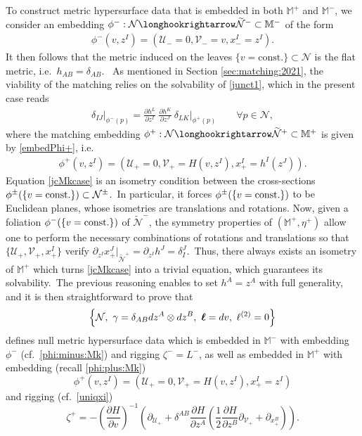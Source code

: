 \documentclass[11pt]{article}
\numberwithin{equation}{section}
\def\Mkp{\mathbb{M}^+}
\def\Mkm{\mathbb{M}^-}
\def\flatp{\eta^+}
\newcommand{\bm}[1]{\mbox{\boldmath $#1$}}
\newcommand\N{\mathcal N}
\newcommand\elltwo{\ell^{(2)}}
\newcommand\rig{\zeta}
\def\bmell{\bm{\ell}}
\def\ellc{\bmell}
\def\bmell{\bm{\ell}}
\def\ellc{\bmell}
\newcommand{\cp}{\partial}
\newcommand{\lp}{\left(}
\newcommand{\rp}{\right)}
\newcommand{\cu}{\mathcal{U}}
\newcommand{\cv}{\mathcal{V}}
\newcommand{\nullhyp}{\widetilde{\N}}
\newcommand{\spc}{\textup{ }}
\begin{document}
To construct metric hypersurface data that is embedded in both $\Mkp$ and $\Mkm$, 
we consider an embedding $\phi^-:\N\longhookrightarrow\nullhyp^-\subset\Mkm$ of the form
\begin{align}
	\label{phi:minus:Mk} 
	\phi^-(v, z^I) =\left(\cu_-=0,\cv_-= v, x_-^I=z^I \right ).
\end{align}
It then follows that the metric induced on the leaves $\{v=\text{const.}\}\subset\N$ is the flat metric, i.e.\ $h_{AB}=\delta_{AB}$.\ 
%
As mentioned in Section \ref{sec:matching:2021}, the viability of the matching relies on the solvability of 
\eqref{junct1}, which  
in the present case reads
\begin{align}
	\label{jcMkcase}
	\delta_{IJ}\vert_{\phi^-(p)} = \frac{\partial h^L}{\partial z^I}\ \frac{\partial h^K}{\partial z^J}\ \delta_{LK}\vert_{\phi^+(p)}\qquad\forall p\in \N, 
\end{align}
where the matching embedding $\phi^+:\N\longhookrightarrow\nullhyp^+\subset\Mkp$
is given by \eqref{embedPhi+}, i.e. 
\begin{align}
\label{phi:plus:Mk}
\phi^+(v, z^I) =\left(\cu_{+} =0, \cv_{+} = H(v, z^I), x_{+}^I = h^I (z^J) \right ).
\end{align}
Equation \eqref{jcMkcase}
is an isometry condition between the cross-sections 
$\phi^{\pm}(\{v=\textup{const.}\})\subset\N^{\pm}$.\  
In particular, 
it forces  $\phi^{\pm}(\{v=\textup{const.}\})$ 
to be Euclidean planes, whose isometries are translations and rotations. Now, 
given a foliation $\phi^{-}(\{v=\textup{const.}\})$ of $\nullhyp^-$, the symmetry properties of 
$(\Mkp,\flatp)$ allow one to perform the necessary combinations of rotations and translations so that 
$\{\cu_+,\cv_+,x_+^I\}$ 
verify $\cp_{z^I}x_+^J\vert_{\nullhyp^+}=\cp_{z^I}h^J=\delta_I^J$.\ 
Thus,  there always exists an isometry of $\Mkp$ which turns \eqref{jcMkcase} into a trivial equation, which guarantees its solvability.\ 
The previous reasoning enables to set $h^A=z^A$ with full generality, and 
it is then straightforward to prove that  
$$\Big\{\N,\spc\gamma=\delta_{AB}dz^A\otimes dz^B,\spc\ellc=dv,\spc \elltwo=0\Big\}$$ defines null metric hypersurface data which  
is embedded in $\Mkm$ with embedding $\phi^-$ (cf.\ \eqref{phi:minus:Mk}) and rigging $\rig^-=L^-$, as well as embedded in $\Mkp$ with embedding (recall \eqref{phi:plus:Mk}) $$\phi^+(v, z^I) =\left(\cu_{+} =0, \cv_{+} = H(v, z^I), x_{+}^I =  z^I \right )$$  and rigging  
(cf.\ \eqref{uniqxi})
\begin{equation}
	\label{uniqxi:Mk}
\rig^+=-\lp\frac{\cp H}{\cp v}\rp^{-1}\lp 
\cp_{\cu_{+}}	+  \delta^{AB} \frac{\cp H}{\cp z^A}
	\lp \frac{1}{2} 
	\frac{\cp H}{\cp z^B}     \cp_{\cv_{+}}+\cp_{x^B_{+}}\rp \rp.
\end{equation}
\end{document}
